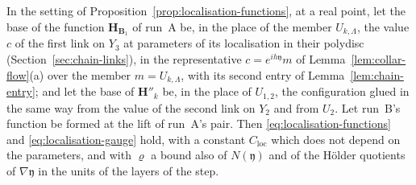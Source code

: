 
\begin{lemma}\label{lem:link-function-base}
In the setting of Proposition~\ref{prop:localisation-functions}, at a real point, let the base of the function $\mathbf H_{\mathbf B_1}$ of run~A be, in the place of the member $U_{k,\Lambda}$, the value $c$ of the first link on $Y_3$ at parameters of its localisation in their polydisc (Section~\ref{sec:chain-links}), in the representative $c = e^{ih\mathfrak y}m$ of Lemma~\ref{lem:collar-flow}(a) over the member $m = U_{k,\Lambda}$, with its second entry of Lemma~\ref{lem:chain-entry}; and let the base of $\mathbf H''_k$ be, in the place of $U_{1,2}$, the configuration glued in the same way from the value of the second link on $Y_2$ and from $U_2$. Let run~B's function be formed at the lift of run~A's pair. Then \eqref{eq:localisation-functions} and \eqref{eq:localisation-gauge} hold, with a constant $C_{\mathrm{loc}}$ which does not depend on the parameters, and with $\varrho$ a bound also of $N(\mathfrak y)$ and of the H\"older quotients of $\nabla\mathfrak y$ in the units of the layers of the step.
\end{lemma}


